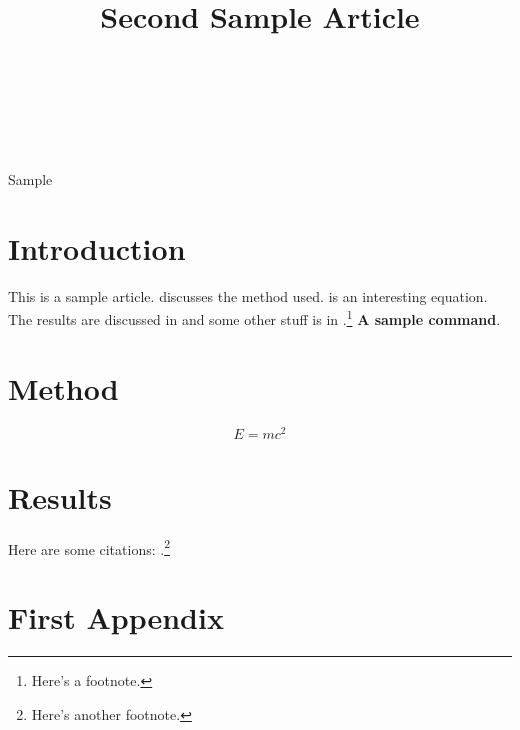 \documentclass[wcp]{jmlr}
\title[Article 2]{Second Sample Article}
\author{\Name{Bob {de Winter}}\Email{bdw@sample.com}\\
\Name{{\'E}louise Mary Finchley}\Email{emf@sample.com}\\
\Name{Jack Mark Jones}\Email{jmj@sample.com}\\
\addr{University of No Where}}
\newcommand{\samplecommand}{\textbf{A sample command}}
\begin{document}
\maketitle

\begin{abstract}
\lipsum[1]
\end{abstract}
\begin{keywords}
Sample
\end{keywords}

\section{Introduction}

This is a sample article.  discusses
the method used.  is an interesting 
equation. The results are discussed in 
and some other stuff is in .\footnote{Here's
a footnote.}
\samplecommand.

\lipsum

\section{Method}\label{sec:method}

\lipsum

\begin{equation}\label{eq:emc2}
E = mc^2
\end{equation}

\section{Results}\label{sec:results}

\lipsum

Here are some citations:
\citet{guyon-elisseeff-03,guyon2007causalreport}.\footnote{Here's
another footnote.}



\appendix
\section{First Appendix}\label{apd:first}

\lipsum
\end{document}
